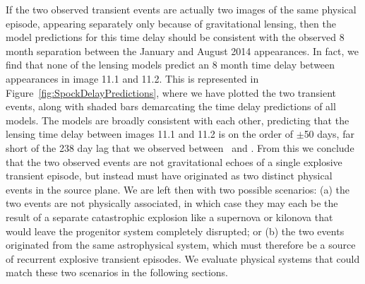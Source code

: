 If the two observed transient events are actually two images of the same physical episode, appearing separately only because of gravitational lensing, then the model predictions for this time delay should be consistent with the observed 8 month separation between the January and August 2014 appearances.  In fact, we find that none of the lensing models predict an 8 month time delay between appearances in image 11.1 and 11.2.  This is represented in Figure~\ref{fig:SpockDelayPredictions}, where we have plotted the two transient events, along with shaded bars demarcating the time delay predictions of all models.   The models are broadly consistent with each other, predicting that the lensing time delay between images 11.1 and 11.2 is on the order of $\pm$50 days, far short of the 238 day lag that we observed between \spockone\ and \spocktwo.  From this we conclude that the two observed events are not gravitational echoes of a single explosive transient episode, but instead must have originated as two distinct physical events in the source plane.  We are left then with two possible scenarios: (a) the two events are not physically associated, in which case they may each be the result of a separate catastrophic explosion like a supernova or kilonova that would leave the progenitor system completely disrupted; or (b) the two events originated from the same astrophysical system, which must therefore be a source of recurrent explosive transient episodes.   We evaluate physical systems that could match these two scenarios in the following sections.

